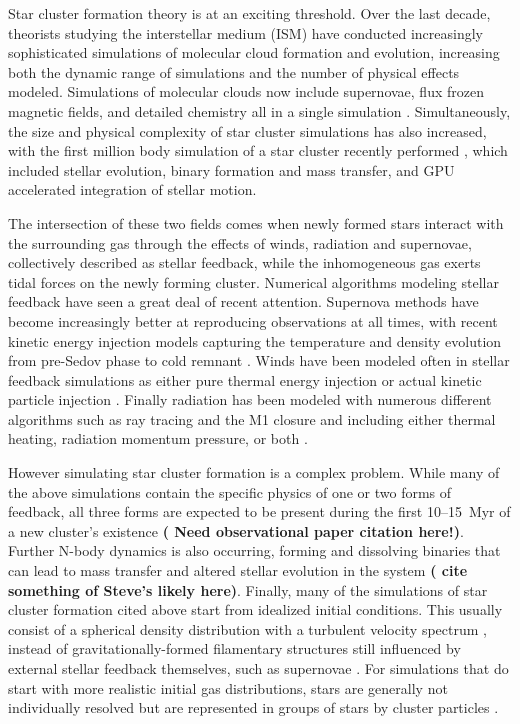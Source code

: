 \documentclass[11pt]{article}
\begin{document}
Star cluster formation theory is at an exciting threshold. Over the last decade, theorists studying the interstellar medium (ISM) have conducted increasingly sophisticated simulations of molecular cloud formation and evolution, increasing both the dynamic range of simulations and the number of physical effects modeled. Simulations of molecular clouds now include supernovae, flux frozen magnetic fields, and detailed chemistry all in a single simulation \citep{Klessen_2000_GasDynTurb,Mac_Low_Star_Formation,Joung_SN_driven_turb,Hill_2012,ibanez-mejia_gravitational_2015,haid_supernova-blast_2016,Walch_SILLC1}. Simultaneously, the size and physical complexity of star cluster simulations has also increased, with the first million body simulation of a star cluster recently performed \citep{Dragon_Wang}, which included stellar evolution, binary formation and mass transfer, and GPU accelerated integration of stellar motion. 

The intersection of these two fields comes when newly formed stars interact with the surrounding gas through the effects of winds, radiation and supernovae, collectively described as stellar feedback, while the inhomogeneous gas exerts tidal forces on the newly forming cluster. Numerical algorithms modeling stellar feedback have seen a great deal of recent attention. Supernova methods have become increasingly better at reproducing observations at all times, with recent kinetic energy injection models capturing the temperature and density evolution from pre-Sedov phase to cold remnant \citep{simpson_kinetic_2015,Kim_Ostriker_2015ApJ}. Winds have been modeled often in stellar feedback simulations as either pure thermal energy injection or actual kinetic particle injection \citep{Pelupessy_embedded_SC,Dale_winds_2013}. Finally radiation has been modeled with numerous different algorithms such as ray tracing and the M1 closure and including either thermal heating, radiation momentum pressure, or both \citep{Dale_Winds_and_H2,wise_enzo+moray:_2011,Rosdahl_RAMSES_RT_2015,Raskutti_Ostriker_2016}.

However simulating star cluster formation is a complex problem. While many of the above simulations contain the specific physics of one or two forms of feedback, all three forms are expected to be present during the first 10--15~Myr %
of a new cluster's existence {\bf( Need observational paper citation here!)}. Further N-body dynamics is also occurring, forming and dissolving binaries that can lead to mass transfer and altered stellar evolution in the system {\bf( cite something of Steve's likely here)}. Finally, many of the simulations of star cluster formation cited above start from idealized initial conditions. This usually consist of a spherical density distribution with a turbulent velocity spectrum \citep{Dale_Winds_and_H2,Raskutti_Ostriker_2016}, instead of gravitationally-formed filamentary structures \citep{ibanez-mejia_gravitational_2015} still influenced by external stellar feedback themselves, such as supernovae \citep{Hill_2012}. For simulations that do start with more realistic initial gas distributions, stars are generally not individually resolved but are represented in groups of stars by cluster particles \citep{Gatto_Walch_SILCC3_2016,dobbs_properties_2016}.
\end{document}

